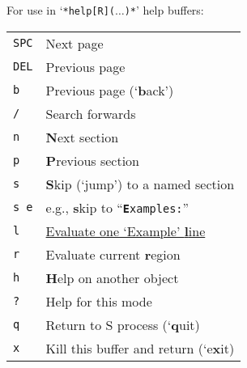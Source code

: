 \documentclass[a4paper]{article}
\newenvironment{tabI}{\begin{tabular}{p{16mm}l}}{\end{tabular}}
\begin{document}
\begin{multicols}{2}
For use in `\texttt{*help[R]($\ldots$)*}' help buffers:

\begin{tabI}
  \texttt{SPC} & Next page \\
  \texttt{DEL} & Previous page \\
  \texttt{b}   & Previous page (`\textbf{b}ack')\\
  \texttt{/}   & Search forwards \\
  \texttt{n}   & \textbf{N}ext section \\
  \texttt{p}   & \textbf{P}revious section \\
  \texttt{s}   & \textbf{S}kip (`jump') to a named section \\
  \texttt{s e} & e.g., \textbf{s}kip to ``\texttt{\textbf{E}xamples:}'' \\
  \texttt{l}   & \underline{Evaluate one `Example' \textbf{l}ine} \\
  \texttt{r}   & Evaluate current \textbf{r}egion \\
  \texttt{h}   &\textbf{H}elp on another object \\
  \texttt{?}   & Help for this mode \\
  \texttt{q}   & Return to S process (`\textbf{q}uit) \\
  \texttt{x}   & Kill this buffer and return (`e\textbf{x}it) \\
\end{tabI}

\end{multicols}
\end{document}

